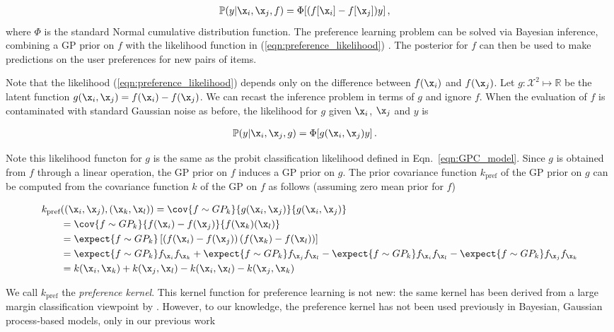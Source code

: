\begin{align}
\mathbb{P}(y|\x_i,\x_j,f) &= \Phi[(f[\x_i] - f[\x_j])y]\,,\label{eqn:preference_likelihood}
\end{align}
where $\Phi$ is the standard Normal cumulative distribution function. The preference learning problem can be solved via Bayesian inference, combining a GP prior on $f$ with the likelihood function in (\ref{eqn:preference_likelihood}) \citep{Chu2005}. The posterior for $f$ can then be used to make predictions on the user preferences for new pairs of items.

Note that the likelihood (\ref{eqn:preference_likelihood}) depends only on the difference between $f(\x_i)$ and $f(\x_j)$.
Let $g:\mathcal{X}^2\mapsto\mathbb{R}$ be the latent function $g(\x_i,\x_j) = f(\x_i) - f(\x_j)$.
We can recast the inference problem in terms of $g$ and ignore $f$. When the evaluation of $f$ is contaminated with standard Gaussian noise as before, the likelihood for $g$ given $\x_i$, $\x_j$ and $y$ is

\begin{align}
\mathbb{P}(y|\x_i,\x_j,g) &= \Phi[g(\x_i, \x_j)y]\,.\label{eqn:preference_likelihood2}
\end{align}

Note this likelihood functon for $g$ is the same as the probit classification likelihood defined in Eqn.\ \eqref{eqn:GPC_model}. Since $g$ is obtained from $f$ through a linear operation, the GP prior on $f$ induces a GP prior on $g$. The prior covariance function $k_\text{pref}$ of the GP prior on $g$ can be computed from the covariance function $k$ of the GP on $f$ as follows (assuming zero mean prior for $f$)

\begin{align}
	k_\text{pref}&((\x_i,\x_j),(\x_k,\x_l)) = \cov{f\sim GP_k}{g(\x_i,\x_j)}{g(\x_i,\x_j)}\\
	&= \cov{f\sim GP_k}{f(\x_i)-f(\x_j)}{f(\x_k)(\x_l)}\\
	&= \expect{f\sim GP_k}\left[\left(f(\x_i)-f(\x_j)\right)\left(f(\x_k)-f(\x_l)\right)\right]\\
	&= \expect{f\sim GP_k}f_{\x_i}f_{\x_k} + \expect{f\sim GP_k}f_{\x_j}f_{\x_l} - \expect{f\sim GP_k}f_{\x_i}f_{\x_l} - \expect{f\sim GP_k}f_{\x_j}f_{\x_k}\\
	&= k(\x_i,\x_k) + k(\x_j,\x_l) - k(\x_i,\x_l) - k(\x_j,\x_k) \label{eqn:preference_kernel}
\end{align}

We call $k_\text{pref}$ the \emph{preference kernel}. This kernel function for preference learning is not new: the same kernel has been derived from a large margin classification viewpoint by \citet{furnkranz2010}. However, to our knowledge, the preference kernel has not been used previously in Bayesian, Gaussian process-based models, only in our previous work \citep{Houlsby2011,Houlsby2012preference}

